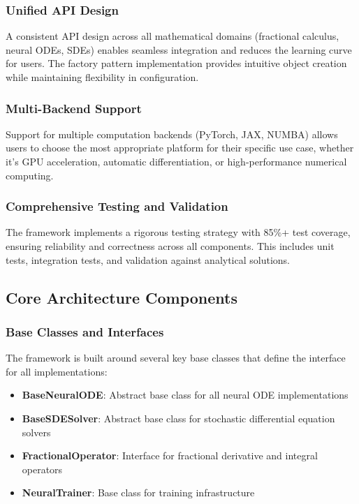 \subsubsection{Unified API Design}

A consistent API design across all mathematical domains (fractional calculus, neural ODEs, SDEs) enables seamless integration and reduces the learning curve for users. The factory pattern implementation provides intuitive object creation while maintaining flexibility in configuration.

\subsubsection{Multi-Backend Support}

Support for multiple computation backends (PyTorch, JAX, NUMBA) allows users to choose the most appropriate platform for their specific use case, whether it's GPU acceleration, automatic differentiation, or high-performance numerical computing.

\subsubsection{Comprehensive Testing and Validation}

The framework implements a rigorous testing strategy with 85\%+ test coverage, ensuring reliability and correctness across all components. This includes unit tests, integration tests, and validation against analytical solutions.

\subsection{Core Architecture Components}

\subsubsection{Base Classes and Interfaces}

The framework is built around several key base classes that define the interface for all implementations:

\begin{itemize}
    \item \textbf{BaseNeuralODE}: Abstract base class for all neural ODE implementations
    \item \textbf{BaseSDESolver}: Abstract base class for stochastic differential equation solvers
    \item \textbf{FractionalOperator}: Interface for fractional derivative and integral operators
    \item \textbf{NeuralTrainer}: Base class for training infrastructure
\end{itemize}

